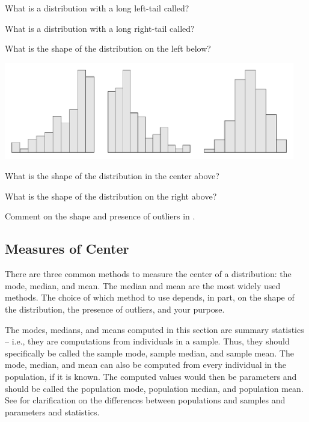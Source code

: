 \documentclass[10pt,openany]{book}\usepackage[]{graphicx}\usepackage[]{color}
\begin{document}
\vspace{24pt}
\begin{exsection}
  \item \label{revex:quEDALSkew} What is a distribution with a long left-tail called? 
  \item \label{revex:quEDARSkew} What is a distribution with a long right-tail called? 
  \item \label{revex:quEDALSkewg} What is the shape of the distribution on the left below? 


\begin{center}
  \includegraphics[width=5in]{Figs/HistQuest-1}
\end{center}
  \item \label{revex:quEDASymg} What is the shape of the distribution in the center above? 
  \item \label{revex:quEDARSkewg} What is the shape of the distribution on the right above? 
  \item \label{revex:quEDAlead} Comment on the shape and presence of outliers in . 
\end{exsection}


\subsection{Measures of Center} \label{sec:quEDACenter}
There are three common methods to measure the center of a distribution: the mode, median, and mean.  The median and mean are the most widely used methods.  The choice of which method to use depends, in part, on the shape of the distribution, the presence of outliers, and your purpose.

The modes, medians, and means computed in this section are summary statistics -- i.e., they are computations from individuals in a sample.  Thus, they should specifically be called the sample mode, sample median, and sample mean.  The mode, median, and mean can also be computed from every individual in the population, if it is known.  The computed values would then be parameters and should be called the population mode, population median, and population mean.  See  for clarification on the differences between populations and samples and parameters and statistics.
\end{document}
